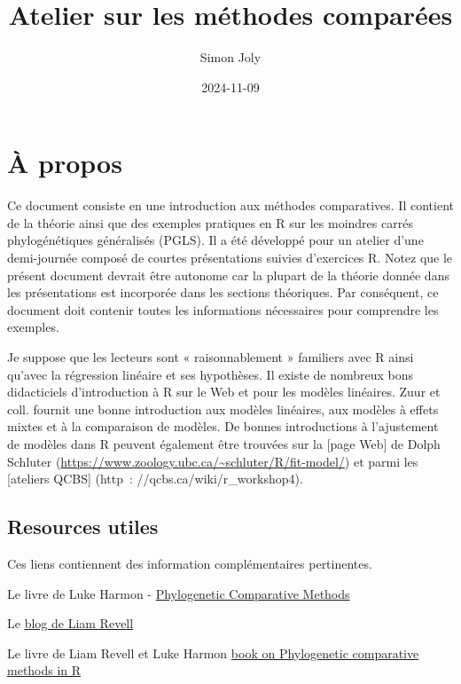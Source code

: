 \documentclass[
]{book}
\title{Atelier sur les méthodes comparées}
\author{Simon Joly}
\date{2024-11-09}
\begin{document}
\maketitle

{
\setcounter{tocdepth}{1}
\tableofcontents
}
\chapter{À propos}\label{uxe0-propos}

Ce document consiste en une introduction aux méthodes comparatives. Il contient de la théorie ainsi que des exemples pratiques en R sur les moindres carrés phylogénétiques généralisés (PGLS). Il a été développé pour un atelier d'une demi-journée composé de courtes présentations suivies d'exercices R. Notez que le présent document devrait être autonome car la plupart de la théorie donnée dans les présentations est incorporée dans les sections théoriques. Par conséquent, ce document doit contenir toutes les informations nécessaires pour comprendre les exemples.

Je suppose que les lecteurs sont « raisonnablement » familiers avec R ainsi qu'avec la régression linéaire et ses hypothèses. Il existe de nombreux bons didacticiels d'introduction à R sur le Web et pour les modèles linéaires. Zuur et coll. \citep{zuur2007analysing} fournit une bonne introduction aux modèles linéaires, aux modèles à effets mixtes et à la comparaison de modèles. De bonnes introductions à l'ajustement de modèles dans R peuvent également être trouvées sur la {[}page Web{]} de Dolph Schluter (\url{https://www.zoology.ubc.ca/~schluter/R/fit-model/}) et parmi les {[}ateliers QCBS{]} (http~: //qcbs.ca/wiki/r\_workshop4).

\section{Resources utiles}\label{resources-utiles}

Ces liens contiennent des information complémentaires pertinentes.

Le livre de Luke Harmon - \href{https://lukejharmon.github.io/pcm/}{Phylogenetic Comparative Methods}

Le \href{http://blog.phytools.org/}{blog de Liam Revell}

Le livre de Liam Revell et Luke Harmon \href{https://press.princeton.edu/books/ebook/9780691219042/phylogenetic-comparative-methods-in-r}{book on Phylogenetic comparative methods in R}
\end{document}
